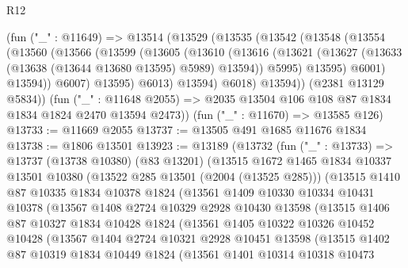 \begin{lexlean}{R12}
\begin{coremodule}
      (fun ("_" : @11649) =>
      @13514
        (@13529
          (@13535
            (@13542
              (@13548
                (@13554
                  (@13560
                    (@13566
                      (@13599
                        (@13605
                          (@13610
                            (@13616
                              (@13621
                                (@13627 (@13633 (@13638 (@13644 @13680 @13595) @5989) @13594))
                                @5995)
                              @13595)
                            @6001)
                          @13594))
                      @6007)
                    @13595)
                  @6013)
                @13594)
              @6018)
            @13594))
        (@2381 @13129 @5834))
      (fun ("_" : @11648 @2055) => @2035 @13504 @106 @108 @87 @1834 @1834 @1824 @2470 @13594 @2473))
    (fun ("_" : @11670) => @13585 @126)
@13733 := @11669 @2055
@13737 := @13505 @491 @1685 @11676 @1834
@13738 := @1806 @13501
@13923 := @13189
    (@13732
      (fun ("_" : @13733) =>
      @13737
        (@13738 @10380)
        (@83 @13201)
        (@13515
          @1672
          @1465
          @1834
          @10337
          @13501
          @10380
          (@13522 @285 @13501 (@2004 (@13525 @285)))
          (@13515
            @1410
            @87
            @10335
            @1834
            @10378
            @1824
            (@13561
              @1409
              @10330
              @10334
              @10431
              @10378
              (@13567
                @1408
                @2724
                @10329
                @2928
                @10430
                @13598
                (@13515
                  @1406
                  @87
                  @10327
                  @1834
                  @10428
                  @1824
                  (@13561
                    @1405
                    @10322
                    @10326
                    @10452
                    @10428
                    (@13567
                      @1404
                      @2724
                      @10321
                      @2928
                      @10451
                      @13598
                      (@13515
                        @1402
                        @87
                        @10319
                        @1834
                        @10449
                        @1824
                        (@13561
                          @1401
                          @10314
                          @10318
                          @10473

\end{coremodule}
\end{lexlean}

